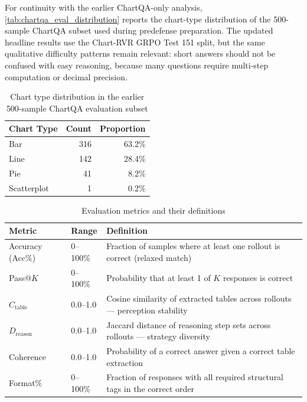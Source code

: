 \documentclass{iutbscthesis}
\begin{document}
For continuity with the earlier ChartQA-only analysis, \autoref{tab:chartqa_eval_distribution} reports the chart-type distribution of the 500-sample ChartQA subset used during predefense preparation. The updated headline results use the Chart-RVR GRPO Test 151 split, but the same qualitative difficulty patterns remain relevant: short answers should not be confused with easy reasoning, because many questions require multi-step computation or decimal precision.

\begin{table}[H]
    \centering
    \begin{tabular}{lrr}
        \toprule
        Chart Type & Count & Proportion \\
        \midrule
        Bar & 316 & 63.2\% \\
        Line & 142 & 28.4\% \\
        Pie & 41 & 8.2\% \\
        Scatterplot & 1 & 0.2\% \\
        \bottomrule
    \end{tabular}
    \caption{Chart type distribution in the earlier 500-sample ChartQA evaluation subset}
    \label{tab:chartqa_eval_distribution}
\end{table}

\begin{table}[H]
    \centering
    \begin{tabular}{lp{1.8cm}p{7cm}}
        \toprule
        Metric & Range & Definition \\
        \midrule
        Accuracy (Acc\%) & 0--100\% & Fraction of samples where at least one rollout is correct (relaxed match) \\
        Pass@$K$ & 0--100\% & Probability that at least 1 of $K$ responses is correct \cite{chen2021evaluating} \\
        $C_{\text{table}}$ & 0.0--1.0 & Cosine similarity of extracted tables across rollouts --- perception stability \\
        $D_{\text{reason}}$ & 0.0--1.0 & Jaccard distance of reasoning step sets across rollouts --- strategy diversity \\
        Coherence & 0.0--1.0 & Probability of a correct answer given a correct table extraction \\
        Format\% & 0--100\% & Fraction of responses with all required structural tags in the correct order \\
        \bottomrule
    \end{tabular}
    \caption{Evaluation metrics and their definitions}
    \label{tab:metrics}
\end{table}
\end{document}
